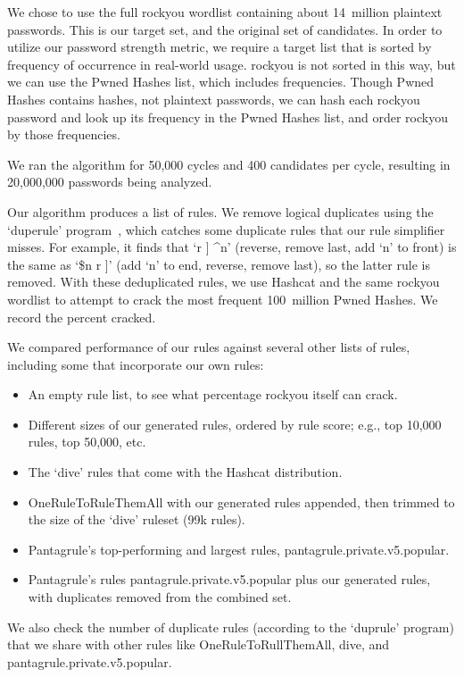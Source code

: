 \documentclass[letterpaper,twocolumn,10pt]{article}
\begin{document}
We chose to use the full rockyou wordlist containing about 14~million plaintext
passwords. This is our target set, and the original set of candidates. In order
to utilize our password strength metric, we require a target list that is
sorted by frequency of occurrence in real-world usage. rockyou is not sorted in
this way, but we can use the Pwned Hashes list, which includes frequencies.
Though Pwned Hashes contains hashes, not plaintext passwords, we can hash each
rockyou password and look up its frequency in the Pwned Hashes list, and order
rockyou by those frequencies.

We ran the algorithm for 50,000 cycles and 400 candidates per cycle, resulting
in 20,000,000 passwords being analyzed.

Our algorithm produces a list of rules. We remove logical duplicates using the `duperule' program~\cite{duprule}, which catches some duplicate rules that our rule simplifier misses. For example, it finds that `r ] \^{}n' (reverse, remove last, add `n' to front) is the same as `\$n r ]' (add `n' to end, reverse, remove last), so the latter rule is removed. With these deduplicated rules, we use Hashcat and the same rockyou wordlist to attempt to crack the most frequent 100~million Pwned Hashes. We record the percent cracked.

We compared performance of our rules against several other lists of rules,
including some that incorporate our own rules:

\begin{itemize}
\item An empty rule list, to see what percentage rockyou itself can crack.
\item Different sizes of our generated rules, ordered by rule score; e.g., top
10,000 rules, top 50,000, etc.
\item The `dive' rules that come with the Hashcat distribution.
\item OneRuleToRuleThemAll with our generated rules appended, then trimmed to the size of the `dive' ruleset (99k rules).
\item Pantagrule's top-performing and largest rules, pantagrule.private.v5.popular.
\item Pantagrule's rules pantagrule.private.v5.popular plus our generated rules, with duplicates removed from the combined set.
\end{itemize}

We also check the number of duplicate rules (according to the `duprule' program) that we share with other rules like OneRuleToRullThemAll, dive, and pantagrule.private.v5.popular.
\end{document}
